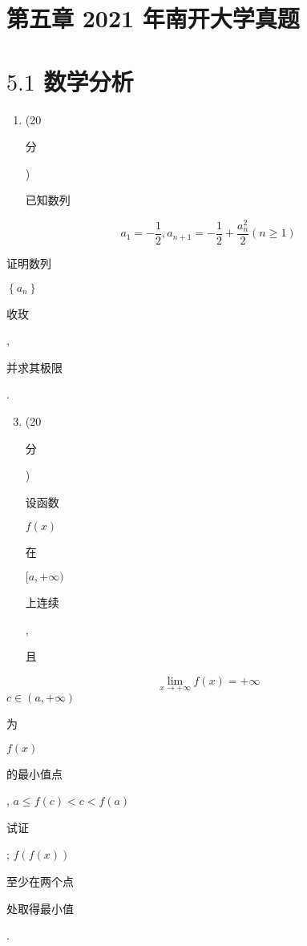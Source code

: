 \documentclass[10pt]{article}
\begin{document}
\section{第五章 2021 年南开大学真题}
\section{$5.1$ 数学分析}
\begin{enumerate}
  \item (20 \begin{CJK}{UTF8}{mj}分\end{CJK}) \begin{CJK}{UTF8}{mj}已知数列\end{CJK}
\end{enumerate}
$$
a_{1}=-\frac{1}{2}, a_{n+1}=-\frac{1}{2}+\frac{a_{n}^{2}}{2}(n \geqslant 1)
$$
\begin{CJK}{UTF8}{mj}证明数列\end{CJK} $\left\{a_{n}\right\}$ \begin{CJK}{UTF8}{mj}收玫\end{CJK}, \begin{CJK}{UTF8}{mj}并求其极限\end{CJK}.

\begin{enumerate}
  \setcounter{enumi}{2}
  \item (20 \begin{CJK}{UTF8}{mj}分\end{CJK}) \begin{CJK}{UTF8}{mj}设函数\end{CJK} $f(x)$ \begin{CJK}{UTF8}{mj}在\end{CJK} $[a,+\infty)$ \begin{CJK}{UTF8}{mj}上连续\end{CJK}, \begin{CJK}{UTF8}{mj}且\end{CJK}
\end{enumerate}
$$
\lim _{x \rightarrow+\infty} f(x)=+\infty
$$
$c \in(a,+\infty)$ \begin{CJK}{UTF8}{mj}为\end{CJK} $f(x)$ \begin{CJK}{UTF8}{mj}的最小值点\end{CJK}, $a \leqslant f(c)<c<f(a)$ \begin{CJK}{UTF8}{mj}试证\end{CJK}; $f(f(x))$ \begin{CJK}{UTF8}{mj}至少在两个点\end{CJK} \begin{CJK}{UTF8}{mj}处取得最小值\end{CJK}.
\end{document}
